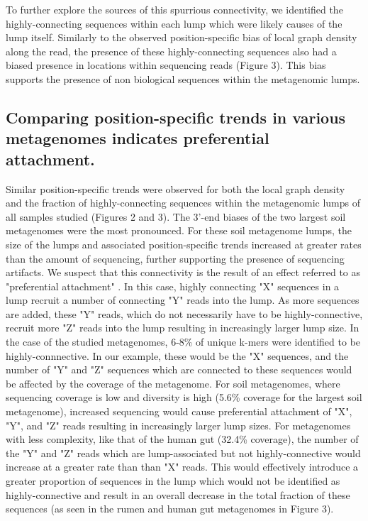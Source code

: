 \documentclass[11pt]{article} %
\begin{document}
To further explore the sources of this spurrious connectivity, we identified the highly-connecting sequences within each lump which were likely causes of the lump itself.  Similarly to the observed position-specific bias of local graph density along the read, the presence of these highly-connecting sequences also had a biased presence in locations within sequencing reads (Figure 3).  This bias supports the presence of non biological sequences within the metagenomic lumps.

\subsection{Comparing position-specific trends in various metagenomes indicates preferential attachment.}
Similar position-specific trends were observed for both the local graph density and the fraction of highly-connecting sequences within the metagenomic lumps of all samples studied (Figures 2 and 3).  The 3'-end biases of the two largest soil metagenomes were the most pronounced.  For these soil metagenome lumps, the size of the lumps and associated position-specific trends increased at greater rates than the amount of sequencing, further supporting the presence of sequencing artifacts.  We suspect that this connectivity is the result of an effect referred to as "preferential attachment" \cite{Barabasi:1999p1083}. In this case, highly connecting "X" sequences in a lump recruit a number of connecting "Y" reads into the lump.  As more sequences are added, these "Y" reads, which do not necessarily have to be highly-connective, recruit more "Z" reads into the lump resulting in increasingly larger lump size.  In the case of the studied metagenomes, 6-8\% of unique k-mers were identified to be highly-connnective.  In our example, these would be the "X" sequences, and the number of "Y" and "Z" sequences which are connected to these sequences would be affected by the coverage of the metagenome.  For soil metagenomes, where sequencing coverage is low and diversity is high (5.6\% coverage for the largest soil metagenome), increased sequencing would cause preferential attachment of "X", "Y", and "Z" reads resulting in increasingly larger lump sizes.  For metagenomes with less complexity, like that of the human gut (32.4\% coverage), the number of the "Y" and "Z" reads which are lump-associated but not highly-connective would increase at a greater rate than than "X" reads.   This would effectively introduce a greater proportion of sequences in the lump which would not be identified as highly-connective and result in an overall decrease in the total fraction of these sequences (as seen in the rumen and human gut metagenomes in Figure 3).  
\end{document}
